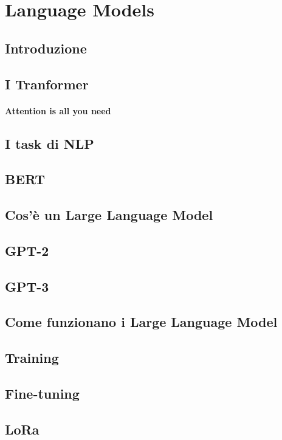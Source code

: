 \chapter{Language Models}
\label{Language_Models}
\section{Introduzione}
\section{I Tranformer}
\subsubsection[Attention is all you need]{Attention is all you need}
\section{I task di NLP}
\section{BERT}
\section{Cos'è un Large Language Model}
\section{GPT-2}
\section{GPT-3}
\section{Come funzionano i Large Language Model}
\section{Training}
\section{Fine-tuning}
\section{LoRa}